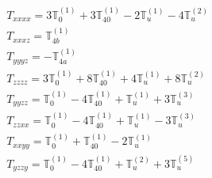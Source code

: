 \documentclass[fleqn,8pt,landscape]{jsarticle}
\begin{document}
\begin{align*}
& T_{xxxx} = 3 \mathbb{T}_{0}^{(1)} + 3 \mathbb{T}_{40}^{(1)} - 2 \mathbb{T}_{u}^{(1)} - 4 \mathbb{T}_{u}^{(2)} \\
& T_{xxxz} = \mathbb{T}_{4b}^{(1)} \\
& T_{yyyz} = - \mathbb{T}_{4a}^{(1)} \\
& T_{zzzz} = 3 \mathbb{T}_{0}^{(1)} + 8 \mathbb{T}_{40}^{(1)} + 4 \mathbb{T}_{u}^{(1)} + 8 \mathbb{T}_{u}^{(2)} \\
& T_{yyzz} = \mathbb{T}_{0}^{(1)} - 4 \mathbb{T}_{40}^{(1)} + \mathbb{T}_{u}^{(1)} + 3 \mathbb{T}_{u}^{(3)} \\
& T_{zzxx} = \mathbb{T}_{0}^{(1)} - 4 \mathbb{T}_{40}^{(1)} + \mathbb{T}_{u}^{(1)} - 3 \mathbb{T}_{u}^{(3)} \\
& T_{xxyy} = \mathbb{T}_{0}^{(1)} + \mathbb{T}_{40}^{(1)} - 2 \mathbb{T}_{u}^{(1)} \\
& T_{yzzy} = \mathbb{T}_{0}^{(1)} - 4 \mathbb{T}_{40}^{(1)} + \mathbb{T}_{u}^{(2)} + 3 \mathbb{T}_{u}^{(5)}
\end{align*}
\end{document}
